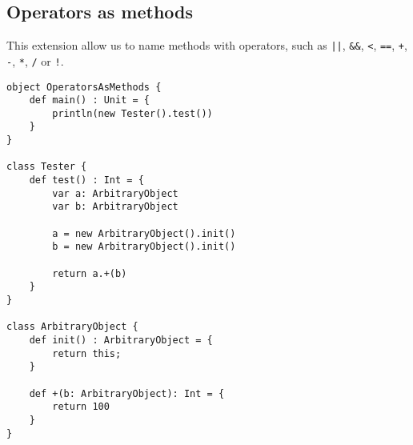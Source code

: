 \begin{lstlisting}

\end{lstlisting}

\subsection{Operators as methods}

This extension allow us to name methods with operators, such as \lstinline$||$, \lstinline$&&$, \lstinline$<$, \lstinline$==$, \lstinline$+$, \lstinline$-$, \lstinline$*$, \lstinline$/$ or \lstinline$!$.

\begin{lstlisting}
object OperatorsAsMethods {
    def main() : Unit = {
        println(new Tester().test())
    }
}

class Tester {
    def test() : Int = {
		var a: ArbitraryObject
		var b: ArbitraryObject

		a = new ArbitraryObject().init()
		b = new ArbitraryObject().init()

		return a.+(b)
    }
}

class ArbitraryObject {
	def init() : ArbitraryObject = {
		return this;
	}

	def +(b: ArbitraryObject): Int = {
		return 100
	}
}
\end{lstlisting}
